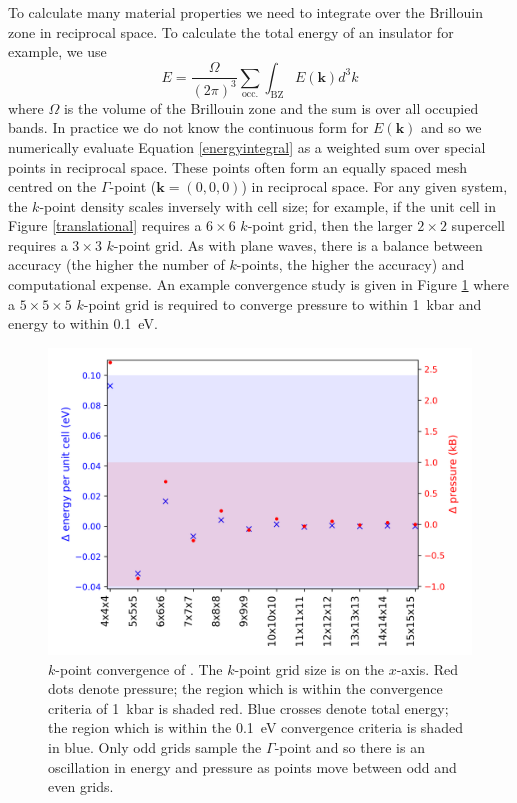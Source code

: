 To calculate many material properties we need to integrate over the Brillouin zone in reciprocal space. To calculate the total energy of an insulator for example, we use
\begin{equation} \label{energyintegral}
    E = \frac{\Omega}{(2\pi)^3}\sum_\textrm{occ.}\int_\textrm{BZ}E(\textbf{k})d^3k
\end{equation}
where $\Omega$ is the volume of the Brillouin zone and the sum is over all occupied bands. 
In practice we do not know the continuous form for $E(\textbf{k})$ and so we numerically evaluate Equation \ref{energyintegral} as a weighted sum over special points in reciprocal space. These points often form an equally spaced mesh centred on the $\Gamma$-point ($\textbf{k}=(0,0,0)$) in reciprocal space. For any given system, the $k$-point density scales inversely with cell size; for example, if the unit cell in Figure \ref{translational} requires a $6\times6$ $k$-point grid, then the larger $2\times2$ supercell requires a $3\times3$ $k$-point grid. As with plane waves, there is a balance between accuracy (the higher the number of $k$-points, the higher the accuracy) and computational expense. An example convergence study is given in Figure \ref{kpointconvergence} where a $5\times5\times5$ $k$-point grid is required to converge pressure to within \SI{1}{\kilo\bar} and energy to within \SI{0.1}{\electronvolt}.

\begin{figure}[h]
\centering
  \includegraphics[width=0.7\columnwidth]{figures/ch3/kpointconvergence.png}
  \caption[ $k$-point convergence]{$k$-point convergence of . The $k$-point grid size is on the $x$-axis. Red dots denote pressure; the region which is within the convergence criteria of \SI{1}{\kilo\bar} is shaded red. Blue crosses denote total energy; the region which is within the \SI{0.1}{\electronvolt} convergence criteria is shaded in blue. Only odd grids sample the $\Gamma$-point and so there is an oscillation in energy and pressure as points move between odd and even grids.}
  \label{kpointconvergence}
\end{figure}


